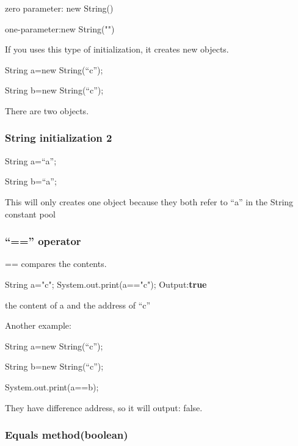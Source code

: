\documentclass[
  paper=a4,
  ,captions=tableheading
]{scrartcl}
\newenvironment{Shaded}{}{}
\newcommand{\BuiltInTok}[1]{#1}
\newcommand{\FunctionTok}[1]{\textcolor[rgb]{0.02,0.16,0.49}{#1}}
\newcommand{\KeywordTok}[1]{\textcolor[rgb]{0.00,0.44,0.13}{\textbf{#1}}}
\newcommand{\NormalTok}[1]{#1}
\newcommand{\StringTok}[1]{\textcolor[rgb]{0.25,0.44,0.63}{#1}}
\begin{document}
zero parameter: new String()

one-parameter:new String("")

If you uses this type of initialization, it creates new objects.

String a=new String(\enquote{c});

String b=new String(\enquote{c});

There are two objects.

\hypertarget{string-initialization-2}{%
\subsubsection{String initialization 2}\label{string-initialization-2}}

String a=\enquote{a};

String b=\enquote{a};

This will only creates one object because they both refer to \enquote{a}
in the String constant pool

\hypertarget{operator}{%
\subsubsection{\texorpdfstring{\enquote{==}
operator}{``=='' operator}}\label{operator}}

== compares the contents.

\begin{Shaded}
\begin{Highlighting}[]
\BuiltInTok{String}\NormalTok{ a=}\StringTok{"c"}\NormalTok{;}
\BuiltInTok{System}\NormalTok{.}\FunctionTok{out}\NormalTok{.}\FunctionTok{print}\NormalTok{(a==}\StringTok{"c"}\NormalTok{);}
\NormalTok{Output:}\KeywordTok{true}
\end{Highlighting}
\end{Shaded}

the content of a and the address of \enquote{c}

Another example:

String a=new String(\enquote{c});

String b=new String(\enquote{c});

System.out.print(a==b);

They have difference address, so it will output: false.

\hypertarget{equals-methodboolean}{%
\subsubsection{Equals method(boolean)}\label{equals-methodboolean}}
\end{document}
